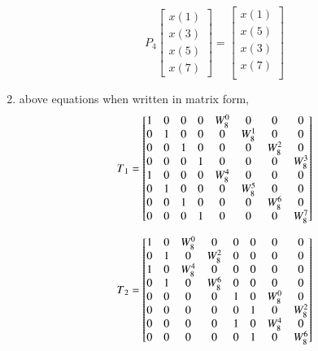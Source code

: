 \documentclass[journal,12pt,twocolumn]{IEEEtran}
\renewcommand\thesection{\arabic{section}}
\begin{document}
\begin{enumerate}[label=\thesection.\arabic*.,ref=\thesection.\theenumi]
\begin{equation}
P_{4}
\begin{bmatrix}
x(1) \\ 
x(3) \\ 
x(5) \\
x(7)
\end{bmatrix}
 = 
\begin{bmatrix}
x(1) \\ 
x(5) \\ 
x(3) \\ 
x(7) \\
\end{bmatrix}
\end{equation}
\item
above equations when written in matrix form, 
\begin{equation}
T\textsubscript{1}  
=
\begin{bmatrix}
1 & 0 & 0 & 0 & W^{0}_{8} & 0 & 0 & 0 \\
0 & 1 & 0 & 0 & 0 & W^{1}_{8} & 0 & 0 \\
0 & 0 & 1 & 0 & 0 & 0  & W^{2}_{8}& 0 \\
0 & 0 & 0 & 1 & 0 & 0 & 0 & W^{3}_{8}\\
1 & 0 & 0 & 0 & W^{4}_{8} & 0 & 0 & 0 \\
0 & 1 & 0 & 0 & 0 & W^{5}_{8} & 0 & 0 \\
0 & 0 & 1 & 0  & 0 & 0 & W^{6}_{8}& 0 \\
0 & 0 & 0 & 1  & 0 & 0 & 0 & W^{7}_{8}
\end{bmatrix}
\end{equation}

\begin{equation}
T\textsubscript{2}  
=
\begin{bmatrix}
1 & 0 & W^{0}_{8} & 0 & 0  & 0 & 0 & 0 \\
0 & 1 & 0 & W^{2}_{8}& 0 & 0  & 0 & 0 \\
1 & 0 & W^{4}_{8}& 0 & 0 & 0 & 0  & 0 \\
0 & 1 & 0 & W^{6}_{8}& 0 & 0 & 0 & 0 \\
0 & 0 & 0 & 0 & 1  & 0 & W^{0}_{8} & 0 \\
0 & 0 & 0 & 0 & 0  & 1 & 0 & W^{2}_{8}\\
0 & 0 & 0 & 0  & 1 & 0 & W^{4}_{8}& 0 \\
0 & 0 & 0 & 0  & 0 & 1 & 0 & W^{6}_{8}
\end{bmatrix}
\end{equation}


\end{enumerate}
\end{document}
